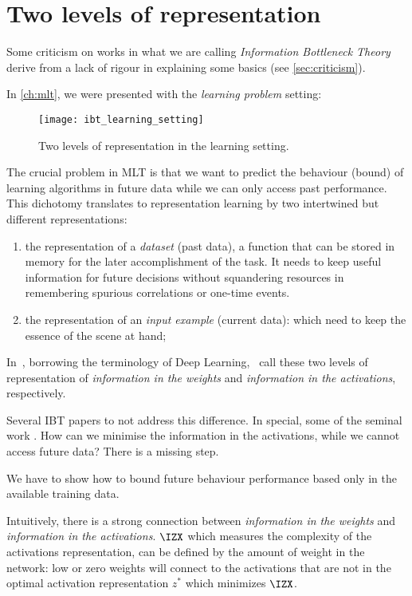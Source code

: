 \section{Two levels of representation}\label{sec:2_levels}
Some criticism on works in what we are calling \emph{Information Bottleneck Theory} derive from a lack of rigour in explaining some basics (see \cref{sec:criticism}).

In \cref{ch:mlt}, we were presented with the \emph{learning problem} setting:
\begin{figure}[ht] \centering
    \texttt{[image: ibt\_learning\_setting]}
    \caption{Two levels of representation in the learning setting.}\label{fig:two_levels_representation}
\end{figure}

The crucial problem in \ac*{MLT} is that we want to predict the behaviour (bound) of learning algorithms in future data while we can only access past performance. This dichotomy translates to representation learning by two intertwined but different representations:
\begin{enumerate}[label=\protect\circled{\arabic*}]
  \item the representation of a \emph{dataset} (past data), a function that can be stored in memory for the later accomplishment of the task. It needs to keep useful information for future decisions without squandering resources in remembering spurious correlations or one-time events.
  \item the representation of an \emph{input example} (current data): which need to keep the essence of the scene at hand;
\end{enumerate}

In~\cite{achille:2019phd, achille:2019weights}, borrowing the terminology of Deep Learning,~\citeauthor{achille:2019phd} call these two levels of representation of \emph{information in the weights} and \emph{information in the activations}, respectively.

Several \ac{IBT} papers to not address this difference. In special, some of the seminal work \cite{tishby:2015, shwartz-ziv:2017, tishby:2017}. How can we minimise the information in the activations, while we cannot access future data? There is a missing step.

We have to show how to bound future behaviour performance based only in the available training data.

Intuitively, there is a strong connection between  \emph{information in the weights} and \emph{information in the activations}. $\IZX$ which  measures the complexity of the activations representation, can be defined by the amount of weight in the network: low or zero weights will connect to the activations that are not in the optimal activation representation $z^*$ which minimizes $\IZX$.

